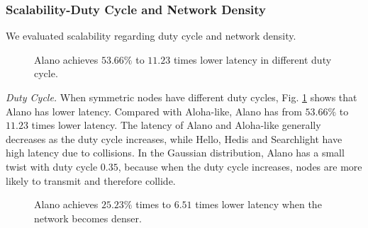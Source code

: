 \subsubsection{Scalability-Duty Cycle and Network Density}

We evaluated %
scalability regarding duty cycle and network density.

\begin{figure}[!h]
\centering
{}
\hspace{0.01in}
\caption{Alano achieves $53.66\%$ to $11.23$ times lower latency in different duty cycle.}
\label{fig_dutycycle}
\end{figure}


\emph{Duty Cycle.}
When symmetric nodes have different duty cycles, Fig.
\ref{fig_dutycycle} shows that Alano has lower latency. Compared with
Aloha-like, Alano has from $53.66\%$ to $11.23$ times lower latency. The
latency of Alano and Aloha-like generally decreases as the duty cycle
increases, while Hello, Hedis and Searchlight have high latency due to
collisions. In the Gaussian distribution, Alano has a small twist with
duty cycle $0.35$, because when the duty cycle increases, nodes are more
likely to transmit and therefore collide.


\begin{figure}[!h]
\centering
{}
\hspace{0.01in}
\caption{Alano achieves $25.23\%$ times to $6.51$ times lower latency when the network becomes denser.}
\label{fig_node}
\end{figure}

